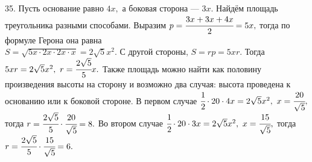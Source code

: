 35. Пусть основание равно $4x,$ а боковая сторона --- $3x.$ Найдём площадь треугольника разными способами. Выразим $p=\cfrac{3x+3x+4x}{2}=5x,$ тогда по формуле Герона она равна \\$S=\sqrt{5x\cdot2x\cdot 2x\cdot x}=2\sqrt{5}x^2.$ С другой стороны, $S=rp=5xr.$ Тогда $5xr=2\sqrt{5}x^2,\ r=\cfrac{2\sqrt{5}}{5}x.$ Также площадь можно найти как половину произведения высоты на сторону и возможно два случая: высота проведена к основанию или к боковой стороне. В первом случае $\cfrac{1}{2}\cdot20\cdot4x=2\sqrt{5}x^2,\ x=\cfrac{20}{\sqrt{5}},$ тогда $r=\cfrac{2\sqrt{5}}{5}\cdot\cfrac{20}{\sqrt{5}}=8.$ Во втором случае
$\cfrac{1}{2}\cdot20\cdot3x=2\sqrt{5}x^2,\ x=\cfrac{15}{\sqrt{5}},$ тогда $r=\cfrac{2\sqrt{5}}{5}\cdot\cfrac{15}{\sqrt{5}}=6.$\\
